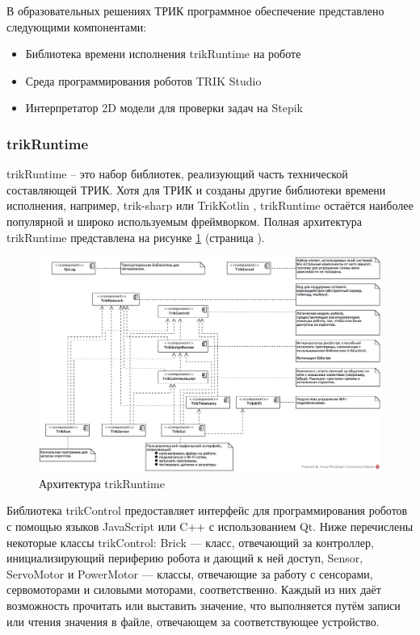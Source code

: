 \documentclass[14pt]{matmex-diploma-custom}
\begin{document}
В образовательных решениях ТРИК программное обеспечение представлено следующими компонентами:
\begin{itemize}
    \item Библиотека времени исполнения trikRuntime на роботе
    \item Среда программирования роботов TRIK Studio
    \item Интерпретатор 2D модели для проверки задач на Stepik
\end{itemize}

\subsubsection{trikRuntime}
trikRuntime -- это набор библиотек, реализующий часть технической составляющей ТРИК. Хотя для ТРИК и созданы другие библиотеки времени исполнения, например, trik-sharp \cite{KirsanovSECR, KirsanovDiploma} или TrikKotlin \cite{BelkovYearlyProject}, trikRuntime остаётся наиболее популярной и широко используемым фреймворком. Полная архитектура trikRuntime представлена на рисунке \ref{trikRuntime} (страница \pageref{trikRuntime}).

\begin{figure}[h]
	\includegraphics[width=\textwidth]{images/trikRuntime.jpg}
	\caption{Архитектура trikRuntime}
	\label{trikRuntime}
\end{figure}

Библиотека trikControl предоставляет интерфейс для программирования роботов с помощью языков JavaScript или C++ с использованием Qt. Ниже перечислены некоторые классы trikControl: Brick — класс, отвечающий за контроллер, инициализирующий периферию робота и дающий к ней доступ, Sensor, ServoMotor и PowerMotor — классы, отвечающие за работу с сенсорами, сервомоторами и силовыми моторами, соответственно. Каждый из них даёт возможность прочитать или выставить значение, что выполняется путём записи или чтения значения в файле, отвечающем за соответствующее устройство.
\end{document}
